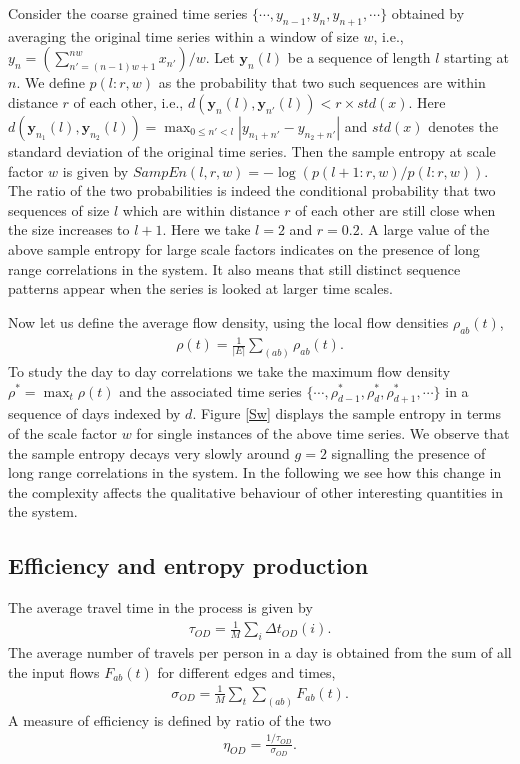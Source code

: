 \documentclass[aps,preprint]{revtex4-1}
\begin{document}
Consider the coarse grained time series $\{\cdots,y_{n-1},y_n,y_{n+1},\cdots\}$ obtained by averaging the original time series within a window of size $w$, i.e., $y_n=(\sum_{n'=(n-1)w+1}^{nw}x_{n'})/w$. Let $\mathbf{y}_n(l)$ be a sequence of length $l$ starting at $n$. We define $p(l:r,w)$ as the probability that two such sequences are within distance $r$ of each other, i.e., $d(\mathbf{y}_n(l),\mathbf{y}_{n'}(l))<r \times std(x)$. Here $d(\mathbf{y}_{n_1}(l),\mathbf{y}_{n_2}(l))=\max_{0\le n'<l}|y_{n_1+n'}-y_{n_2+n'}|$ and $std(x)$ denotes the standard deviation of the original time series. Then the sample entropy at scale factor $w$ is given by $SampEn(l,r,w)=-\log (p(l+1:r,w)/p(l:r,w))$. The ratio of the two probabilities is indeed the conditional probability that two sequences of size $l$ which are within distance $r$ of each other are still close when the size increases to $l+1$. Here we take $l=2$ and $r=0.2$. A large value of the above sample entropy for large scale factors indicates on the presence of long range correlations in the system. It also means that still distinct sequence patterns appear when the series is looked at larger time scales.
 
         
Now let us define the average flow density, using the local flow densities $\rho_{ab}(t)$,
\begin{align}
\rho(t)=\frac{1}{|E|}\sum_{(ab)}\rho_{ab}(t).
\end{align}
To study the day to day correlations we take the maximum flow density $\rho^*=\max_{t}{\rho(t)}$ and the associated time series $\{\cdots,\rho^*_{d-1},\rho^*_d,\rho^*_{d+1},\cdots\}$ in a sequence of days indexed by $d$. Figure \ref{Sw} displays the sample entropy in terms of the scale factor $w$ for single instances of the above time series. We observe that the sample entropy decays very slowly around $g=2$ signalling the presence of long range correlations in the system. In the following we see how this change in the complexity affects the qualitative behaviour of other interesting quantities in the system.              


\subsection{Efficiency and entropy production}\label{S22}
The average travel time in the process is given by
\begin{align}
\tau_{OD}=\frac{1}{M}\sum_{i} \Delta t_{OD}(i).
\end{align}
The average number of travels per person in a day is obtained from the sum of all the input flows $F_{ab}(t)$ for different edges and times, 
\begin{align}
\sigma_{OD}=\frac{1}{M}\sum_{t} \sum_{(ab)} F_{ab}(t).
\end{align}
A measure of efficiency is defined by ratio of the two
\begin{align}
\eta_{OD}=\frac{1/\tau_{OD}}{\sigma_{OD}}.
\end{align}
 
\end{document}
